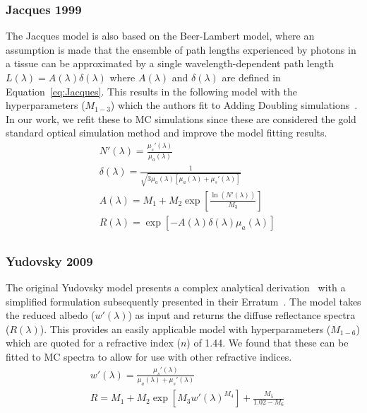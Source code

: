 \subsubsection{Jacques 1999}\label{sec:Jacques}
The Jacques model is also based on the Beer-Lambert model, where an assumption is made that the ensemble of path lengths experienced by photons in a tissue can be approximated by a single wavelength-dependent path length $L(\lambda) = A(\lambda)\delta(\lambda)$ where $A(\lambda)$ and $\delta(\lambda)$ are defined in Equation~\eqref{eq:Jacques}. This results in the following model with the hyperparameters ($M_{1-3}$) which the authors
fit
to Adding Doubling simulations~\citep{Jacques1999}. In our work, we refit these to MC simulations since these are considered the gold standard optical simulation method and improve the model fitting results. 
\begin{equation}
\begin{aligned}
    & N'(\lambda) = \frac{\mu_s'(\lambda)}{\mu_a(\lambda)} \\
    & \delta(\lambda) = \frac{1}{\sqrt{3\mu_a(\lambda)[\mu_a(\lambda) + \mu_s'(\lambda)]}} \\
    & A(\lambda) = M_1 + M_2\exp \left[ \frac{\ln(N'(\lambda))}{M_3} \right] \\
    & R(\lambda) = \exp[-A(\lambda)\delta(\lambda)\mu_a(\lambda)] \\
\end{aligned}
\label{eq:Jacques}
\end{equation}

\subsubsection{Yudovsky 2009}\label{sec:Yudovskysingle}
The original Yudovsky model presents a complex analytical derivation~\citep{Yudovsky2009} with a simplified formulation subsequently presented in their Erratum~\citep{Yudovsky2015}. The model takes the reduced albedo ($w'(\lambda)$) as input and returns the diffuse reflectance spectra ($R(\lambda)$). This provides an easily applicable model with hyperparameters ($M_{1-6}$) which are quoted for a refractive index ($n$) of 1.44. We found that these can be fitted to MC spectra to allow for use with other refractive indices. 
\begin{equation}
\begin{aligned}
    & w'(\lambda) = \frac{\mu_s'(\lambda)}{\mu_a(\lambda) + \mu_s'(\lambda)} \\
    & R = M_1 + M_2\exp{\left[ M_3w'(\lambda)^{M_4}\right]} + \frac{M_5}{1.02 - M_6} \\
\end{aligned}
\label{eq:Yudovskysingle}
\end{equation} 

